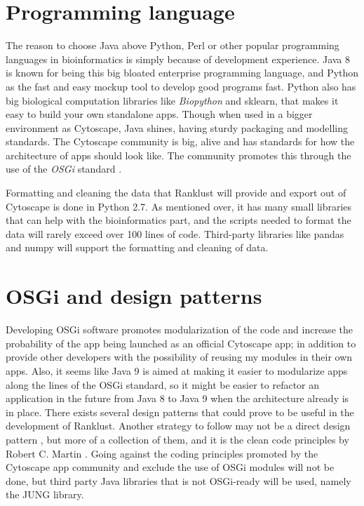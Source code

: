 \section{Programming language}
The reason to choose Java above Python, Perl or other popular programming
languages in bioinformatics is simply because of development experience. Java
8 is known for being this big bloated enterprise programming language, and
Python as the fast and easy mockup tool to develop good programs fast. Python
also has big biological computation libraries like \emph{Biopython}
\cite{biopython} and sklearn\cite{sklearn}, that makes it easy to build your own
standalone apps. Though when used in a bigger environment as Cytoscape, Java
shines, having sturdy packaging and modelling standards. The Cytoscape community
is big, alive and has standards for how the architecture of apps should look
like. The community promotes this through the use of the \emph{OSGi} standard
\cite{cytoscape-osgi}.

Formatting and cleaning the data that Ranklust will provide and export out of
Cytoscape is done in Python 2.7\cite{python}. As mentioned over, it has many
small libraries that can help with the bioinformatics part, and the scripts
needed to format the data will rarely exceed over 100 lines of code.
Third-party libraries like pandas\cite{pandas} and numpy\cite{numpy} will
support the formatting and cleaning of data.

\section{OSGi and design patterns}
Developing OSGi software promotes modularization \cite{modularization} of the
code and increase the probability of the app being launched as an official
Cytoscape app; in addition to provide other developers with the possibility of
reusing my modules in their own apps. Also, it seems like Java 9 is aimed at
making it easier to modularize apps along the lines of the OSGi
standard\cite{jigsaw}, so it might be easier to refactor an application in the
future from Java 8 to Java 9 when the architecture already is in place. There
exists several design patterns that could prove to be useful in the development
of Ranklust. Another strategy to follow may not be a direct design pattern
\cite{designpattern}, but more of a collection of them, and it is the clean
code principles by Robert C. Martin \cite{cleancode}. Going against the coding
principles promoted by the Cytoscape app community and exclude the use of OSGi
modules will not be done, but third party Java libraries that is not OSGi-ready
will be used, namely the JUNG library\cite{jung}.

